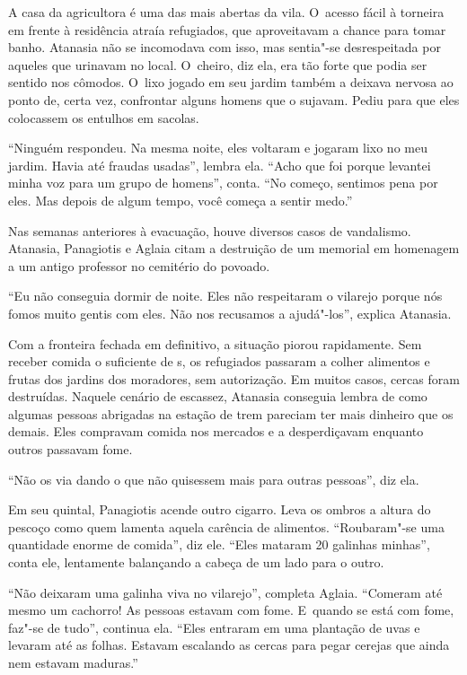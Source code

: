 A casa da agricultora é uma das mais abertas da vila. O~acesso fácil à
torneira em frente à residência atraía refugiados, que aproveitavam a
chance para tomar banho. Atanasia não se incomodava com isso, mas
sentia"-se desrespeitada por aqueles que urinavam no local. O~cheiro, diz
ela, era tão forte que podia ser sentido nos cômodos. O~lixo jogado em
seu jardim também a deixava nervosa ao ponto de, certa vez, confrontar
alguns homens que o sujavam. Pediu para que eles colocassem os entulhos
em sacolas.

``Ninguém respondeu. Na mesma noite, eles voltaram e jogaram lixo no meu
jardim. Havia até fraudas usadas'', lembra ela. ``Acho que foi porque
levantei minha voz para um grupo de homens'', conta. ``No começo,
sentimos pena por eles. Mas depois de algum tempo, você começa a sentir
medo.''

Nas semanas anteriores à evacuação, houve diversos casos de vandalismo.
Atanasia, Panagiotis e Aglaia citam a destruição de um memorial em
homenagem a um antigo professor no cemitério do povoado.

``Eu não conseguia dormir de noite. Eles não respeitaram o vilarejo
porque nós fomos muito gentis com eles. Não nos recusamos a ajudá"-los'',
explica Atanasia.

Com a fronteira fechada em definitivo, a situação piorou rapidamente.
Sem receber comida o suficiente de s, os refugiados passaram a colher
alimentos e frutas dos jardins dos moradores, sem autorização. Em muitos
casos, cercas foram destruídas. Naquele cenário de escassez, Atanasia
conseguia lembra de como algumas pessoas abrigadas na estação de trem
pareciam ter mais dinheiro que os demais. Eles compravam comida nos
mercados e a desperdiçavam enquanto outros passavam fome.

``Não os via dando o que não quisessem mais para outras pessoas'', diz
ela.

Em seu quintal, Panagiotis acende outro cigarro. Leva os ombros a altura
do pescoço como quem lamenta aquela carência de alimentos. ``Roubaram"-se
uma quantidade enorme de comida'', diz ele. ``Eles mataram 20 galinhas
minhas'', conta ele, lentamente balançando a cabeça de um lado para o
outro.

``Não deixaram uma galinha viva no vilarejo'', completa Aglaia.
``Comeram até mesmo um cachorro! As pessoas estavam com fome. E~quando
se está com fome, faz"-se de tudo'', continua ela. ``Eles entraram em uma
plantação de uvas e levaram até as folhas. Estavam escalando as cercas
para pegar cerejas que ainda nem estavam maduras.''

